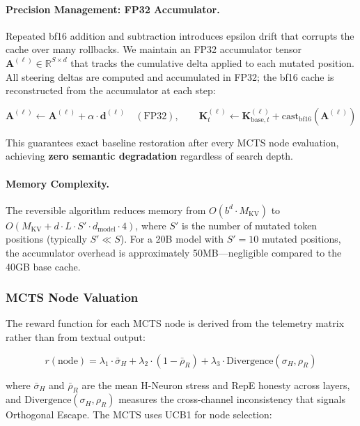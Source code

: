 \documentclass{article}
\begin{document}
\paragraph{Precision Management: FP32 Accumulator.} Repeated bf16 addition and subtraction introduces epsilon drift that corrupts the cache over many rollbacks. We maintain an FP32 accumulator tensor $\mathbf{A}^{(\ell)} \in \mathbb{R}^{S \times d}$ that tracks the cumulative delta applied to each mutated position. All steering deltas are computed and accumulated in FP32; the bf16 cache is reconstructed from the accumulator at each step:

\begin{equation}
\mathbf{A}^{(\ell)} \leftarrow \mathbf{A}^{(\ell)} + \alpha \cdot \mathbf{d}^{(\ell)} \quad (\text{FP32}), \qquad \mathbf{K}_t^{(\ell)} \leftarrow \mathbf{K}_{\text{base},t}^{(\ell)} + \text{cast}_{\text{bf16}}(\mathbf{A}^{(\ell)})
\label{eq:fp32_accumulator}
\end{equation}

This guarantees exact baseline restoration after every MCTS node evaluation, achieving \textbf{zero semantic degradation} regardless of search depth.

\paragraph{Memory Complexity.} The reversible algorithm reduces memory from $O(b^d \cdot M_{\text{KV}})$ to $O(M_{\text{KV}} + d \cdot L \cdot S' \cdot d_{\text{model}} \cdot 4)$, where $S'$ is the number of mutated token positions (typically $S' \ll S$). For a 20B model with $S' = 10$ mutated positions, the accumulator overhead is approximately 50MB---negligible compared to the 40GB base cache.

\subsubsection{MCTS Node Valuation}

The reward function for each MCTS node is derived from the telemetry matrix rather than from textual output:

\begin{equation}
r(\text{node}) = \lambda_1 \cdot \bar{\sigma}_H + \lambda_2 \cdot (1 - \bar{\rho}_R) + \lambda_3 \cdot \text{Divergence}(\sigma_H, \rho_R)
\label{eq:mcts_reward}
\end{equation}

where $\bar{\sigma}_H$ and $\bar{\rho}_R$ are the mean H-Neuron stress and RepE honesty across layers, and $\text{Divergence}(\sigma_H, \rho_R)$ measures the cross-channel inconsistency that signals Orthogonal Escape. The MCTS uses UCB1 for node selection:
\end{document}
